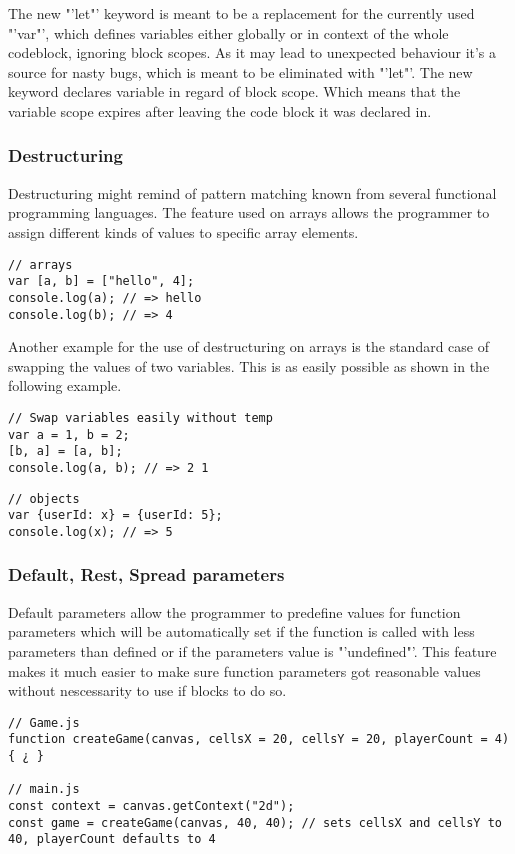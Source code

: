 \documentclass{bioinfo}
\begin{document}
The new "'let"' keyword is meant to be a replacement for the currently used "'var"', which defines variables 
either globally or in context of the whole codeblock, ignoring block scopes. As it may lead to unexpected behaviour
it's a source for nasty bugs, which is meant to be eliminated with "'let"'. The new keyword declares variable in 
regard of block scope. Which means that the variable scope expires after leaving the code block it was declared in.


\subsubsection{Destructuring}
Destructuring might remind of pattern matching known from several functional programming languages.
The feature used on arrays allows the programmer to assign different kinds of values to specific array elements.
\begin{lstlisting}[caption= My Javascript Example]
// arrays
var [a, b] = ["hello", 4];
console.log(a); // => hello
console.log(b); // => 4
\end{lstlisting}

Another example for the use of destructuring on arrays is the standard case of swapping the values of two variables.
This is as easily possible as shown in the following example.
\begin{lstlisting}[caption= My Javascript Example]
// Swap variables easily without temp
var a = 1, b = 2;
[b, a] = [a, b];
console.log(a, b); // => 2 1
\end{lstlisting}


\begin{lstlisting}[caption= My Javascript Example]
// objects
var {userId: x} = {userId: 5};
console.log(x); // => 5
\end{lstlisting}

\subsubsection{Default, Rest, Spread parameters}
Default parameters allow the programmer to predefine values for function parameters which will be automatically
set if the function is called with less parameters than defined or if the parameters value is "'undefined"'.
This feature makes it much easier to make sure function parameters got reasonable values without nescessarity to
use if blocks to do so.

\begin{lstlisting}[caption= My Javascript Example]
// Game.js
function createGame(canvas, cellsX = 20, cellsY = 20, playerCount = 4) { ¿ }

// main.js
const context = canvas.getContext("2d");
const game = createGame(canvas, 40, 40); // sets cellsX and cellsY to 40, playerCount defaults to 4
\end{lstlisting}
\end{document}
